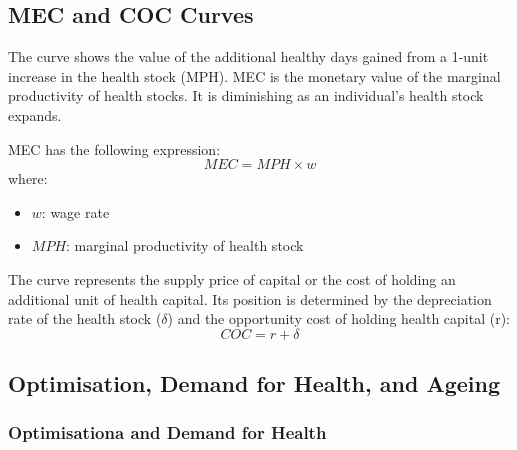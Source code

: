     \subsection{MEC and COC Curves}

        The  curve shows the value of the additional healthy days gained from a 1-unit increase in the health stock (MPH). MEC is the monetary value of the marginal productivity of health stocks. It is diminishing as an individual's health stock expands.

        MEC has the following expression:
        $$MEC=MPH\times w$$
        where:
        \begin{itemize}
            \item $w$: wage rate
            \item $MPH$: marginal productivity of health stock
        \end{itemize}

        The  curve represents the supply price of capital or the cost of holding an additional unit of health capital. Its position is determined by the depreciation rate of the health stock ($\delta$) and the opportunity cost of holding health capital (r):
        $$COC=r+\delta$$

    \subsection{Optimisation, Demand for Health, and Ageing}

        \subsubsection{Optimisationa and Demand for Health}\label{grossman_demand}
    
